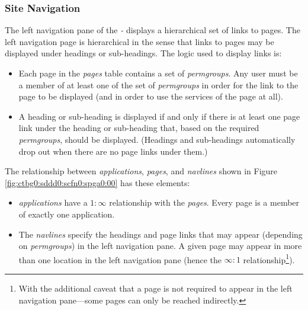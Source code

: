 \subsubsection{Site Navigation}
\label{ctbg0:sddd0:scfn0:ssnv0}

The left navigation pane of the \emph{\productbasename{}-\productversion{}}
displays a hierarchical set of links to pages.  The left navigation page
is hierarchical in the sense that links to pages may be displayed under headings
or sub-headings.  The logic used to
display links is:

\begin{itemize}
\item Each page in the \emph{pages} table contains a set of \emph{permgroups}.
      Any user must be a member of at least one of the set of \emph{permgroups}
      in order for the link to the page to be displayed (and in order to use
      the services of the page at all).
\item A heading or sub-heading is displayed if and only if there is at least
      one page link under the heading or sub-heading that, based on 
      the required \emph{permgroups}, should be displayed.  (Headings and
      sub-headings automatically drop out when there are no page links under
      them.)
\end{itemize}

The relationship between 
\emph{applications}, \emph{pages}, and \emph{navlines} shown
in Figure \ref{fig:ctbg0:sddd0:scfn0:spga0:00} has these
elements:

\begin{itemize}
\item \emph{applications} have a $1:\infty$ relationship with the
      \emph{pages}.  Every page is a member of exactly one application.
\item The \emph{navlines} specify the headings and page links that may appear
      (depending on \emph{permgroups}) in the left navigation pane.  A given page
      may appear in more than one location in the left navigation pane (hence
      the $\infty{}:1$ relationship\footnote{With the additional caveat that
      a page is not required to appear in the left navigation pane---some pages
      can only be reached indirectly.}).
\end{itemize}

